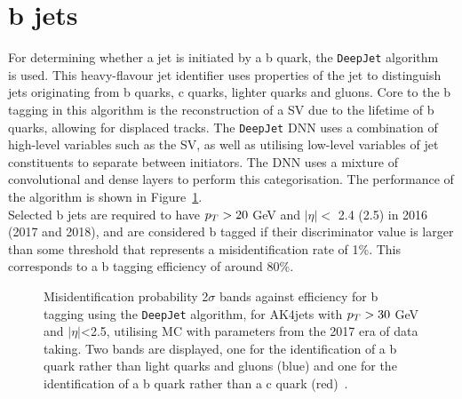 \section{b jets}

For determining whether a jet is initiated by a b quark, the \texttt{DeepJet} algorithm~\cite{CMS:2017wtu,Bols:2020bkb} is used.  
This heavy-flavour jet identifier uses properties of the jet to distinguish jets originating from b quarks, c quarks, lighter quarks and gluons.
Core to the b tagging in this algorithm is the reconstruction of a \ac{SV} due to the lifetime of b quarks, allowing for displaced tracks.
The \texttt{DeepJet} \ac{DNN} uses a combination of high-level variables such as the \ac{SV}, as well as utilising low-level variables of jet constituents to separate between initiators.
The \ac{DNN} uses a mixture of convolutional and dense layers to perform this categorisation.
The performance of the algorithm is shown in Figure~\ref{fig:deepjet}. \\

Selected b jets are required to have $p_{T} > 20$ GeV and $|\eta| <$ 2.4 (2.5) in 2016 (2017 and 2018), and are considered b tagged if their discriminator value is larger than some threshold that represents a misidentification rate of 1\%.
This corresponds to a b tagging efficiency of around 80\%.

\begin{figure}[!hbtp]
\centering
\caption[Plot of the b tagging performance.]{Misidentification probability 2$\sigma$ bands against efficiency for b tagging using the \texttt{DeepJet} algorithm, for AK4jets with $p_{T}>30$ GeV and $|\eta|$<2.5, utilising MC with parameters from the 2017 era of data taking. Two bands are displayed, one for the identification of a b quark rather than light quarks and gluons (blue) and one for the identification of a b quark rather than a c quark (red)~\cite{deepjet}.}
\label{fig:deepjet}
\end{figure}

